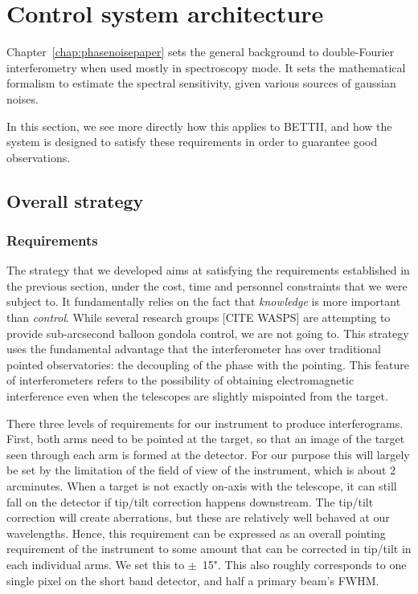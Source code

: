 \section{Control system architecture}
\label{sec:Chap3-ControlSystemArchitecture}
Chapter~\ref{chap:phasenoisepaper} sets the general background to double-Fourier interferometry when used mostly in spectroscopy mode. It sets the mathematical formalism to estimate the spectral sensitivity, given various sources of gaussian noises. 

In this section, we see more directly how this applies to BETTII, and how the system is designed to satisfy these requirements in order to guarantee good observations.

\subsection{Overall strategy}

\subsubsection{Requirements}
The strategy that we developed aims at satisfying the requirements established in the previous section, under the cost, time and personnel constraints that we were subject to. It fundamentally relies on the fact that \textit{knowledge} is more important than \textit{control}. While several research groups [CITE WASPS] are attempting to provide sub-arcsecond balloon gondola control, we are not going to. This strategy uses the fundamental advantage that the interferometer has over traditional pointed observatories: the decoupling of the phase with the pointing. This feature of interferometers refers to the possibility of obtaining electromagnetic interference even when the telescopes are slightly mispointed from the target. 

There three levels of requirements for our instrument to produce interferograms. First, both arms need to be pointed at the target, so that an image of the target seen through each arm is formed at the detector. For our purpose this will largely be set by the limitation of the field of view of the instrument, which is about 2 arcminutes. When a target is not exactly on-axis with the telescope, it can still fall on the detector if tip/tilt correction happens downstream. The tip/tilt correction will create aberrations, but these are relatively well behaved at our wavelengths. Hence, this requirement can be expressed as an overall pointing requirement of the instrument to some amount that can be corrected in tip/tilt in each individual arms. We set this to $\pm$~15". This also roughly corresponds to one single pixel on the short band detector, and half a primary beam's FWHM.

